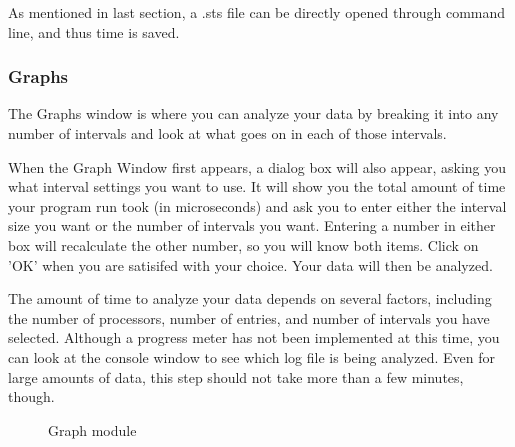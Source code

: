 \documentclass[10pt,dvips]{article}
\begin{document}
   As mentioned in last section, a .sts file can be directly opened through command
   line, and thus time is saved.

\subsubsection{Graphs}

   The Graphs window is where you can analyze your data by breaking it into
   any number of intervals and look at what goes on in each of those intervals.

   When the Graph Window first appears, a dialog box will also appear, asking
   you what interval settings you want to use.  It will show you the total
   amount of time your program run took (in microseconds) and ask you to enter
   either the interval size you want or the number of intervals you want.
   Entering a number in either box will recalculate the other number, so you
   will know both items. Click on 'OK' when you are satisifed with your choice.
   Your data will then be analyzed.

   The amount of time to analyze your data depends on several factors, including
   the number of processors, number of entries, and number of intervals you have
   selected.  Although a progress meter has not been implemented at this time,
   you can look at the console window to see which log file is being analyzed.
   Even for large amounts of data, this step should not take more than a few
   minutes, though.

   \begin{figure}[htb]
   \center
   \caption{Graph module}
   \label{graph}
   \end{figure}
\end{document}
